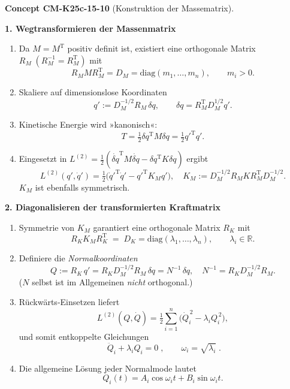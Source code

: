 \documentclass[10pt, letterpaper]{article}
\newcommand{\CustomHeading}[3]{%
  \par\medskip\noindent%
  \textbf{#1 #2} \textnormal{(#3)}.\enskip%
}
\newenvironment{CONC}[2]{\CustomHeading{Concept}{#1}{#2}}{}
\begin{document}
\begin{CONC}{CM-K25c-15-10}{Konstruktion der Massematrix}
\textbf{1. Wegtransformieren der Massenmatrix}

\begin{enumerate}[label=\textbf{\arabic*.},wide,labelindent=0pt,leftmargin=*]
\item
Da $M=M^{\mathrm T}$ positiv definit ist, existiert eine
orthogonale Matrix
\(R_M\;(R_M^{-1}=R_M^{\mathrm T})\) mit
\[
   R_M M R_M^{\mathrm T}=D_M=\mathrm{diag}(m_1,\dots,m_n),
   \qquad m_i>0 .
\]

\item
Skaliere auf dimension\-slose Koordinaten
\[
   q':=D_M^{-1/2}R_M\,\delta q,
   \qquad
   \delta q = R_M^{\mathrm T} D_M^{1/2} q'.
\]

\item
Kinetische Energie wird »kanonisch«:
\[
   T=\tfrac12\delta q^{\mathrm T}M\delta q
     =\tfrac12 q'^{\mathrm T}q'.
\]

\item
Eingesetzt in
\(L^{(2)}=\tfrac12(\dot{\delta q}^{\mathrm T}M\dot{\delta q}-
                    \delta q^{\mathrm T}K\delta q)\)
ergibt
\[
   L^{(2)}(q',\dot q')
   =\tfrac12\bigl(\dot q'^{\mathrm T}\dot q'
             -q'^{\mathrm T}K_M q'\bigr),
   \quad
   K_M:=D_M^{-1/2}R_M K R_M^{\mathrm T} D_M^{-1/2}.
\]
$K_M$ ist ebenfalls symmetrisch.
\end{enumerate}

\textbf{2. Diagonalisieren der transformierten Kraftmatrix}

\begin{enumerate}[label=\textbf{\arabic*.},wide,labelindent=0pt,leftmargin=*]
\item
Symmetrie von $K_M$ garantiert eine orthogonale Matrix
\(R_K\) mit
\[
   R_K K_M R_K^{\mathrm T}
   \;=\;
   D_K=\mathrm{diag}(\lambda_1,\dots,\lambda_n),
   \qquad \lambda_i\in\mathbb R .
\]

\item
Definiere die \emph{Normalkoordinaten}
\[
   Q := R_K\,q'
        = R_K D_M^{-1/2} R_M\,\delta q
        = N^{-1}\,\delta q,
   \quad
   \boxed{N^{-1}=R_K D_M^{-1/2}R_M}.
\]
(\(N\) selbst ist im Allgemeinen \emph{nicht}
orthogonal.)

\item
Rückwärts‐Einsetzen liefert
\[
   L^{(2)}(Q,\dot Q)=
   \tfrac12\sum_{i=1}^{n}
           \bigl(\dot Q_i^{\,2}-\lambda_i Q_i^{\,2}\bigr),
\]
und somit entkoppelte Gleichungen
\[
   \boxed{\;\ddot Q_i+\lambda_i Q_i = 0\;} ,
   \qquad
   \omega_i=\sqrt{\lambda_i}\;.
\]

\item
Die allgemeine Lösung jeder Normalmode lautet
\[
   \boxed{Q_i(t)=A_i\cos\omega_i t
             +B_i\sin\omega_i t}.
\]
\end{enumerate}
\end{CONC}
\end{document}
